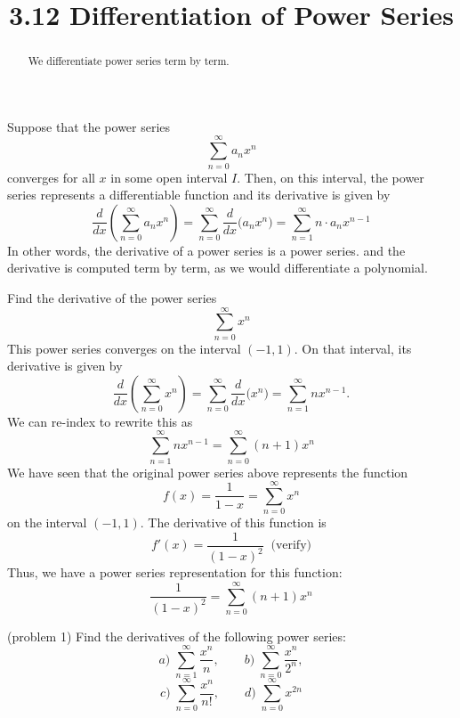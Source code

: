 \documentclass{ximera}
\title{3.12 Differentiation of Power Series}
\begin{document}
\begin{abstract}
We differentiate power series term by term.
\end{abstract}

\maketitle



Suppose that the power series 
\[
\sum_{n=0}^\infty a_n x^n
\]
converges for all $x$ in some open interval $I$. Then, on this interval, the power series represents a differentiable function and its derivative is given by 
\[
\frac{d}{dx} \left( \sum_{n=0}^\infty a_n x^n \right) = \sum_{n=0}^\infty  \frac{d}{dx}\big( a_n x^n \big)  
= \sum_{n=1}^\infty   n\cdot a_n x^{n-1}
\]
In other words, the derivative of a power series is a power series. and the derivative is computed term by term, as we would differentiate a polynomial.

\begin{example}
Find the derivative of the power series
\[
\sum_{n=0}^\infty x^n
\]
This power series converges on the interval $(-1, 1)$.
On that interval, its derivative is given by
\[
\frac{d}{dx}\left( \sum_{n=0}^\infty x^n \right)= \sum_{n=0}^\infty \frac{d}{dx} \big(x^n\big) = \sum_{n=1}^\infty nx^{n-1}.
\]
We can re-index to rewrite this as
\[
\sum_{n=1}^\infty nx^{n-1} = \sum_{n=0}^\infty (n+1)x^n
\]
We have seen that the original power series above represents the function 
\[
f(x) = \frac{1}{1-x} = \sum_{n=0}^\infty x^n
\]
on the interval $(-1, 1)$. The derivative of this function is
\[
f'(x) = \frac{1}{(1-x)^2} \;\; \text{(verify)}
\]
Thus, we have a power series representation for this function:
\[
\frac{1}{(1-x)^2} = \sum_{n=0}^\infty (n+1)x^n
\]
\end{example}



\begin{problem}(problem 1)
Find the derivatives of the following power series:
\[
a) \; \sum_{n=1}^\infty \frac{x^n}{n},\qquad  b) \; \sum_{n=0}^\infty \frac{x^n}{2^n},
\]
\[
 c) \; \sum_{n=0}^\infty \frac{x^n}{n!},\qquad d) \; \sum_{n=0}^\infty x^{2n}
\]
\end{problem}
\end{document}
